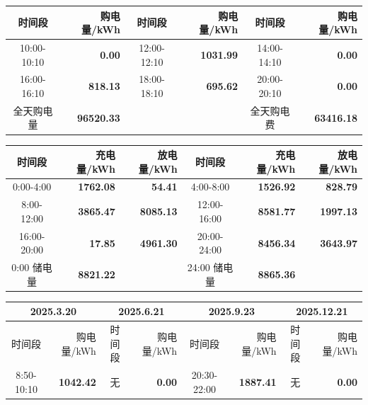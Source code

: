 {\begin{center}
\vspace{0.15\baselineskip}
\begin{tabular}{|c|r|c|r|c|r|}
\hline
时间段 & 购电量/kWh & 时间段 & 购电量/kWh & 时间段 & 购电量/kWh \\
\hline
10:00-10:10 & \textbf{0.00} & 12:00-12:10 & \textbf{1031.99} & 14:00-14:10 & \textbf{0.00} \\
\hline
16:00-16:10 & \textbf{818.13} & 18:00-18:10 & \textbf{695.62} & 20:00-20:10 & \textbf{0.00} \\
\hline
全天购电量 & \textbf{96520.33} & & & 全天购电费 & \textbf{63416.18} \\
\hline
\end{tabular}
\par{}

\vspace{0.15\baselineskip}
\begin{tabular}{|c|r|r|c|r|r|}
\hline
时间段 & 充电量/kWh & 放电量/kWh & 时间段 & 充电量/kWh & 放电量/kWh \\
\hline
0:00-4:00 & \textbf{1762.08} & \textbf{54.41} & 4:00-8:00 & \textbf{1526.92} & \textbf{828.79} \\
\hline
8:00-12:00 & \textbf{3865.47} & \textbf{8085.13} & 12:00-16:00 & \textbf{8581.77} & \textbf{1997.13} \\
\hline
16:00-20:00 & \textbf{17.85} & \textbf{4961.30} & 20:00-24:00 & \textbf{8456.34} & \textbf{3643.97} \\
\hline
0:00 储电量 & \textbf{8821.22} & & 24:00 储电量 & \textbf{8865.36} & \\
\hline
\end{tabular}
\par{}

\vspace{0.15\baselineskip}
\begin{tabular}{|c|r|c|r|c|r|c|r|}
\hline
\multicolumn{2}{c|}{2025.3.20} & \multicolumn{2}{c|}{2025.6.21} & \multicolumn{2}{c|}{2025.9.23} & \multicolumn{2}{c|}{2025.12.21} \\
\hline
时间段 & 购电量/kWh & 时间段 & 购电量/kWh & 时间段 & 购电量/kWh & 时间段 & 购电量/kWh \\
\hline
8:50-10:10 & \textbf{1042.42} & 无 & \textbf{0.00} & 20:30-22:00 & \textbf{1887.41} & 无 & \textbf{0.00} \\
\hline
\end{tabular}
\par{}

\end{center}
}
